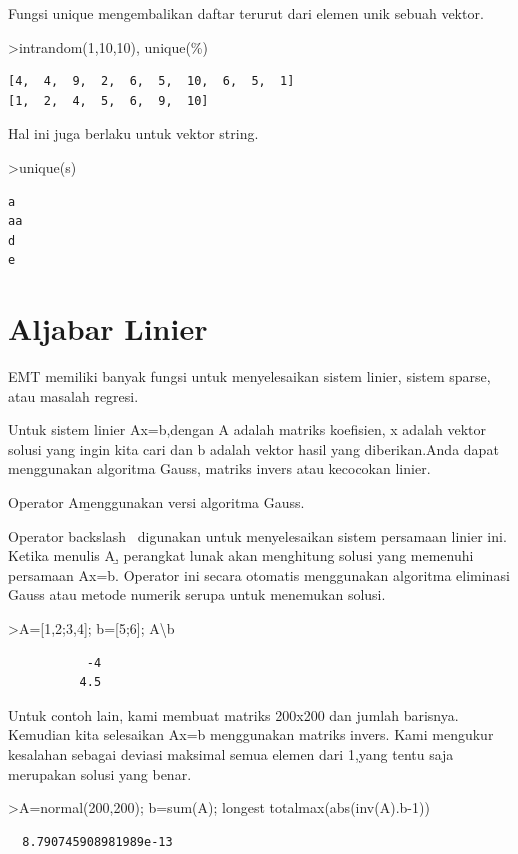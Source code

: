 \documentclass[
]{book}
\begin{document}
Fungsi unique mengembalikan daftar terurut dari elemen unik sebuah vektor.

\textgreater intrandom(1,10,10), unique(\%)

\begin{verbatim}
[4,  4,  9,  2,  6,  5,  10,  6,  5,  1]
[1,  2,  4,  5,  6,  9,  10]
\end{verbatim}

Hal ini juga berlaku untuk vektor string.

\textgreater unique(s)

\begin{verbatim}
a
aa
d
e
\end{verbatim}

\section{Aljabar Linier}\label{aljabar-linier}

EMT memiliki banyak fungsi untuk menyelesaikan sistem linier, sistem sparse, atau masalah regresi.

Untuk sistem linier Ax=b,dengan A adalah matriks koefisien, x adalah vektor solusi yang ingin kita cari dan b adalah vektor hasil yang diberikan.Anda dapat menggunakan algoritma Gauss, matriks invers atau kecocokan linier.

Operator A\b menggunakan versi algoritma Gauss.

Operator backslash ~digunakan untuk menyelesaikan sistem persamaan linier ini. Ketika menulis A\b, perangkat lunak akan menghitung solusi yang memenuhi persamaan Ax=b. Operator ini secara otomatis menggunakan algoritma eliminasi Gauss atau metode numerik serupa untuk menemukan solusi.

\textgreater A={[}1,2;3,4{]}; b={[}5;6{]}; A\textbackslash b

\begin{verbatim}
           -4 
          4.5 
\end{verbatim}

Untuk contoh lain, kami membuat matriks 200x200 dan jumlah barisnya. Kemudian kita selesaikan Ax=b menggunakan matriks invers. Kami mengukur kesalahan sebagai deviasi maksimal semua elemen dari 1,yang tentu saja merupakan solusi yang benar.

\textgreater A=normal(200,200); b=sum(A); longest totalmax(abs(inv(A).b-1))

\begin{verbatim}
  8.790745908981989e-13 
\end{verbatim}
\end{document}
